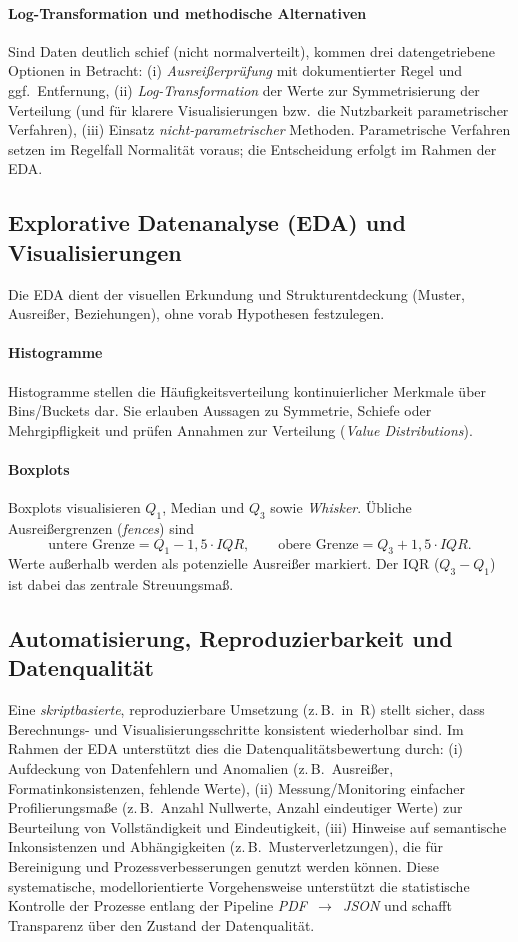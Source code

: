 \paragraph{Log-Transformation und methodische Alternativen}
Sind Daten deutlich schief (nicht normalverteilt), kommen drei datengetriebene Optionen in Betracht:
(i) \emph{Ausreißerprüfung} mit dokumentierter Regel und ggf.\ Entfernung,
(ii) \emph{Log-Transformation} der Werte zur Symmetrisierung der Verteilung (und für klarere Visualisierungen bzw.\ die Nutzbarkeit parametrischer Verfahren),
(iii) Einsatz \emph{nicht-parametrischer} Methoden.
Parametrische Verfahren setzen im Regelfall Normalität voraus; die Entscheidung erfolgt im Rahmen der EDA.

\subsection{Explorative Datenanalyse (EDA) und Visualisierungen}
Die EDA dient der visuellen Erkundung und Strukturentdeckung (Muster, Ausreißer, Beziehungen), ohne vorab Hypothesen festzulegen.

\paragraph{Histogramme}
Histogramme stellen die Häufigkeitsverteilung kontinuierlicher Merkmale über Bins/Buckets dar.
Sie erlauben Aussagen zu Symmetrie, Schiefe oder Mehrgipfligkeit und prüfen Annahmen zur Verteilung (\emph{Value Distributions}).

\paragraph{Boxplots}
Boxplots visualisieren $Q_1$, Median und $Q_3$ sowie \emph{Whisker}. Übliche Ausreißergrenzen (\emph{fences}) sind
\[
\text{untere Grenze} = Q_1 - 1{,}5\cdot IQR, \qquad
\text{obere Grenze} = Q_3 + 1{,}5\cdot IQR.
\]
Werte außerhalb werden als potenzielle Ausreißer markiert. Der IQR ($Q_3-Q_1$) ist dabei das zentrale Streuungsmaß.

\subsection{Automatisierung, Reproduzierbarkeit und Datenqualität}
Eine \emph{skriptbasierte}, reproduzierbare Umsetzung (z.\,B.\ in~R) stellt sicher, dass Berechnungs- und Visualisierungsschritte konsistent wiederholbar sind. Im Rahmen der EDA unterstützt dies die Datenqualitätsbewertung durch:
(i) Aufdeckung von Datenfehlern und Anomalien (z.\,B.\ Ausreißer, Formatinkonsistenzen, fehlende Werte),
(ii) Messung/Monitoring einfacher Profilierungsmaße (z.\,B.\ Anzahl Nullwerte, Anzahl eindeutiger Werte) zur Beurteilung von Vollständigkeit und Eindeutigkeit,
(iii) Hinweise auf semantische Inkonsistenzen und Abhängigkeiten (z.\,B.\ Musterverletzungen), die für Bereinigung und Prozessverbesserungen genutzt werden können.
Diese systematische, modellorientierte Vorgehensweise unterstützt die statistische Kontrolle der Prozesse entlang der Pipeline \emph{PDF~$\rightarrow$~JSON} und schafft Transparenz über den Zustand der Datenqualität.

